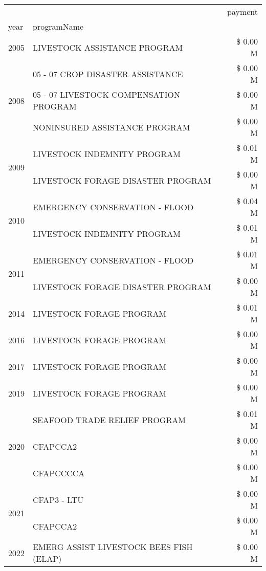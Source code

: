 \begin{tabular}{llr}
\toprule
 &  & payment \\
year & programName &  \\
\midrule
2005 & LIVESTOCK ASSISTANCE PROGRAM & \$ 0.00 M \\
\cline{1-3}
\multirow[t]{3}{*}{2008} & 05 - 07 CROP DISASTER ASSISTANCE & \$ 0.00 M \\
 & 05 - 07 LIVESTOCK COMPENSATION PROGRAM & \$ 0.00 M \\
 & NONINSURED ASSISTANCE PROGRAM & \$ 0.00 M \\
\cline{1-3}
\multirow[t]{2}{*}{2009} & LIVESTOCK INDEMNITY PROGRAM & \$ 0.01 M \\
 & LIVESTOCK FORAGE DISASTER  PROGRAM & \$ 0.00 M \\
\cline{1-3}
\multirow[t]{2}{*}{2010} & EMERGENCY CONSERVATION - FLOOD & \$ 0.04 M \\
 & LIVESTOCK INDEMNITY PROGRAM & \$ 0.01 M \\
\cline{1-3}
\multirow[t]{2}{*}{2011} & EMERGENCY CONSERVATION - FLOOD & \$ 0.01 M \\
 & LIVESTOCK FORAGE DISASTER PROGRAM & \$ 0.00 M \\
\cline{1-3}
2014 & LIVESTOCK FORAGE PROGRAM & \$ 0.01 M \\
\cline{1-3}
2016 & LIVESTOCK FORAGE PROGRAM & \$ 0.00 M \\
\cline{1-3}
2017 & LIVESTOCK FORAGE PROGRAM & \$ 0.00 M \\
\cline{1-3}
2019 & LIVESTOCK FORAGE PROGRAM & \$ 0.00 M \\
\cline{1-3}
\multirow[t]{3}{*}{2020} & SEAFOOD TRADE RELIEF PROGRAM & \$ 0.01 M \\
 & CFAPCCA2 & \$ 0.00 M \\
 & CFAPCCCCA & \$ 0.00 M \\
\cline{1-3}
\multirow[t]{2}{*}{2021} & CFAP3 - LTU & \$ 0.00 M \\
 & CFAPCCA2 & \$ 0.00 M \\
\cline{1-3}
2022 & EMERG ASSIST LIVESTOCK BEES FISH (ELAP) & \$ 0.00 M \\
\cline{1-3}
\bottomrule
\end{tabular}
